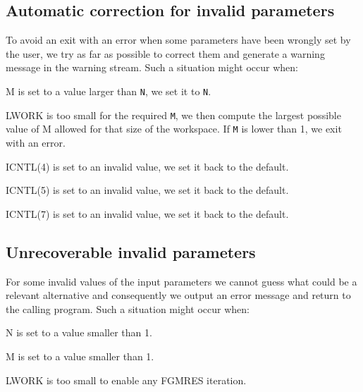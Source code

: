 \subsection{Automatic correction for invalid parameters}
%
   To avoid an exit with an error when some parameters have been wrongly set
by the user, we try as far as possible to correct them and
generate a warning message in the warning stream.
Such a situation might occur when:
\begin{listparam}
  \item[M] is set to a value larger than \texttt{N}, we set it to \texttt{N}.
  \item[LWORK] is too small for the required \texttt{M}, we then compute the largest
    possible value of M allowed for that size of the workspace.
    If \texttt{M} is lower than 1, we exit with an error.
  \item[ICNTL(4)] is set to an invalid value, we set it back to the default.
  \item[ICNTL(5)] is set to an invalid value, we set it back to the default.
  \item[ICNTL(7)] is set to an invalid value, we set it back to the default.
\end{listparam}

%
\subsection{Unrecoverable invalid parameters}
%
For some invalid values of the input parameters we cannot guess what could be
a relevant alternative and consequently we output an error message and
return to the calling program.
Such a situation might occur when:
\begin{listparam}
  \item[N] is set to a value smaller than 1.
  \item[M] is set to a value smaller than 1.
  \item[LWORK] is too small to enable any FGMRES iteration.
\end{listparam}


